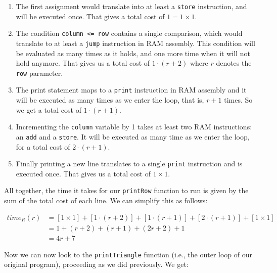 \documentclass[11pt]{article}
\begin{document}
\begin{enumerate}
\item The first assignment would translate into at least a \texttt{store}
instruction, and will be executed once. That gives a total cost
of \(1 = 1 \times 1\).

\item The condition \texttt{column <= row} contains a single comparison, which
would translate to at least a \texttt{jump} instruction in RAM
assembly. This condition will be evaluated as many times as it
holds, and one more time when it will not hold anymore. That
gives us a total cost of \(1 \cdot (r + 2)\) where \(r\) denotes the
\texttt{row} parameter.

\item The print statement maps to a \texttt{print} instruction in RAM assembly
and it will be executed as many times as we enter the loop, that
is, \(r+1\) times. So we get a total cost of \(1 \cdot (r+1)\).

\item Incrementing the \texttt{column} variable by 1 takes at least two RAM
instructions: an \texttt{add} and a \texttt{store}. It will be executed as many
time as we enter the loop, for a total cost of \(2 \cdot (r +
     1)\).

\item Finally printing a new line translates to a single \texttt{print}
instruction and is executed once. That gives us a total cost of
\(1 \times 1\).
\end{enumerate}

All together, the time it takes for our \texttt{printRow} function to run
is given by the sum of the total cost of each line. We can simplify
this as follows:

\begin{align*}
time_R(r) &= [1 \times 1] + [1 \cdot (r + 2)] + [1 \cdot (r+1)] + [2 \cdot (r + 1)] + [1 \times 1] \\
          &= 1 + (r + 2) + (r + 1) + (2r + 2) + 1 \\
          &= 4r + 7 
\end{align*}

Now we can now look to the \texttt{printTriangle} function (i.e., the outer
loop of our original program), proceeding as we did previously. We
get:
\end{document}
